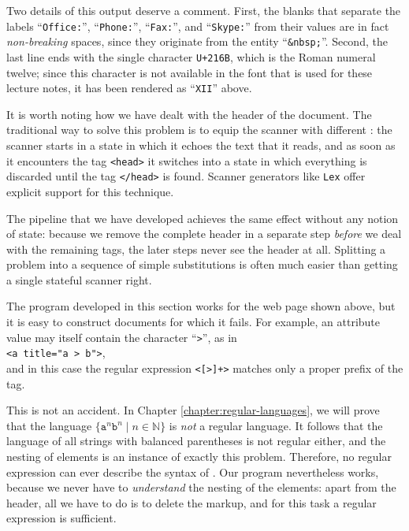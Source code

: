 \noindent
Two details of this output deserve a comment.  First, the blanks that separate the labels
``\texttt{Office:}'', ``\texttt{Phone:}'', ``\texttt{Fax:}'', and ``\texttt{Skype:}'' from their values are in
fact \emph{non-breaking} spaces, since they originate from the entity ``\texttt{\&nbsp;}''.  Second, the last
line ends with the single  character \texttt{U+216B}, which is the Roman numeral twelve;
since this character is not available in the font that is used for these lecture notes, it has been rendered as
``\texttt{XII}'' above.

\remarkEng
It is worth noting how we have dealt with the header of the document.  The traditional way to solve this problem
is to equip the scanner with different : the scanner starts in a state
in which it echoes the text that it reads, and as soon as it encounters the tag \texttt{<head>} it switches into
a state in which everything is discarded until the tag \texttt{</head>} is found.  Scanner generators like
\texttt{Lex} offer explicit support for this technique.

The pipeline that we have developed achieves the same effect without any notion of state: because we remove the
complete header in a separate step \emph{before} we deal with the remaining tags, the later steps never see the
header at all.  Splitting a problem into a sequence of simple substitutions is often much easier than getting a
single stateful scanner right.
\eox

\remarkEng
The program developed in this section works for the web page shown above, but it is easy to construct
 documents for which it fails.  For example, an attribute value may itself contain the character
``\texttt{>}'', as in
\\[0.2cm]
\hspace*{1.3cm}
\texttt{<a title="a > b">},
\\[0.2cm]
and in this case the regular expression \texttt{<[>]+>} matches only a proper prefix of the tag.

This is not an accident.  In Chapter \ref{chapter:regular-languages}, we will prove that the language
$\{ \mathtt{a}^n\mathtt{b}^n \mid n \in \mathbb{N} \}$ is \emph{not} a regular language.  It follows that the
language of all strings with balanced parentheses is not regular either, and the nesting of 
elements is an instance of exactly this problem.  Therefore, no regular expression can ever describe the syntax of .  Our
program nevertheless works, because we never have to \emph{understand} the nesting of the elements: apart from
the header, all we have to do is to delete the markup, and for this task a regular expression is sufficient.
\eox

